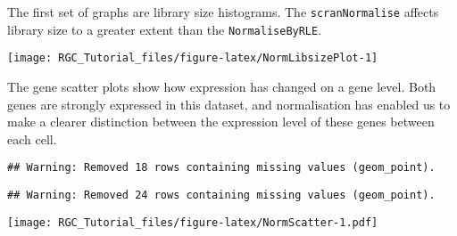 \documentclass[]{article}
\newenvironment{Shaded}{\begin{snugshade}}{\end{snugshade}}
\newcommand{\DataTypeTok}[1]{\textcolor[rgb]{0.13,0.29,0.53}{#1}}
\newcommand{\DecValTok}[1]{\textcolor[rgb]{0.00,0.00,0.81}{#1}}
\newcommand{\KeywordTok}[1]{\textcolor[rgb]{0.13,0.29,0.53}{\textbf{#1}}}
\newcommand{\NormalTok}[1]{#1}
\newcommand{\OperatorTok}[1]{\textcolor[rgb]{0.81,0.36,0.00}{\textbf{#1}}}
\begin{document}
The first set of graphs are library size histograms. The
\texttt{scranNormalise} affects library size to a greater extent than
the \texttt{NormaliseByRLE}.

\begin{Shaded}
\end{Shaded}

\begin{center}\texttt{[image: RGC\_Tutorial\_files/figure-latex/NormLibsizePlot-1]} \end{center}

The gene scatter plots show how expression has changed on a gene level.
Both genes are strongly expressed in this dataset, and normalisation has
enabled us to make a clearer distinction between the expression level of
these genes between each cell.

\begin{Shaded}
\end{Shaded}

\begin{verbatim}
## Warning: Removed 18 rows containing missing values (geom_point).
\end{verbatim}

\begin{verbatim}
## Warning: Removed 24 rows containing missing values (geom_point).
\end{verbatim}

\texttt{[image: RGC\_Tutorial\_files/figure-latex/NormScatter-1.pdf]}
\end{document}
